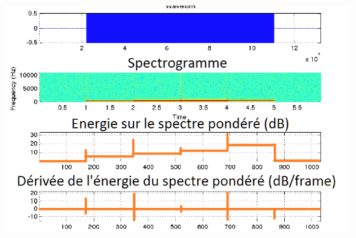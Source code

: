\documentclass[letterpaper, 12pt]{article}
\begin{document}
				\begin{minipage}{0.49\textwidth}
					\includegraphics[width=\textwidth]{Images/onset-amplified}
				\end{minipage}
\end{document}
